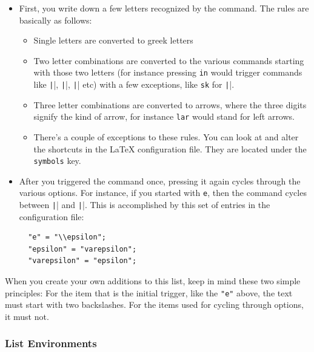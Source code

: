 \documentclass[11pt, x11names]{article}
\begin{document}
\begin{itemize}

  \item First, you write down a few letters recognized by the command. The rules are basically as follows:

  \begin{itemize}

    \item Single letters are converted to greek letters

    \item Two letter combinations are converted to the various commands starting with those two letters (for instance pressing \texttt{in} would trigger commands like \texttt|\int|, \texttt|\inf|, \texttt|\infty| etc) with a few exceptions, like \texttt{sk} for \texttt|\smallskip|.

    \item Three letter combinations are converted to arrows, where the three digits signify the kind of arrow, for instance \texttt{lar} would stand for left arrows.

    \item There's a couple of exceptions to these rules. You can look at and alter the shortcuts in the LaTeX configuration file. They are located under the \texttt{symbols} key.

  \end{itemize}

  \item After you triggered the command once, pressing it again cycles through the various options. For instance, if you started with \texttt{e}, then the command cycles between \texttt|\epsilon| and \texttt|\varepsilon|. This is accomplished by this set of entries in the configuration file:

  \begin{verbatim}
  "e" = "\\epsilon";
  "epsilon" = "varepsilon";
  "varepsilon" = "epsilon";
  \end{verbatim}
\end{itemize}

When you create your own additions to this list, keep in mind these two simple principles: For the item that is the initial trigger, like the \texttt{"e"} above, the text must start with two backslashes. For the items used for cycling through options, it must not.

\subsubsection{List Environments}
\end{document}
